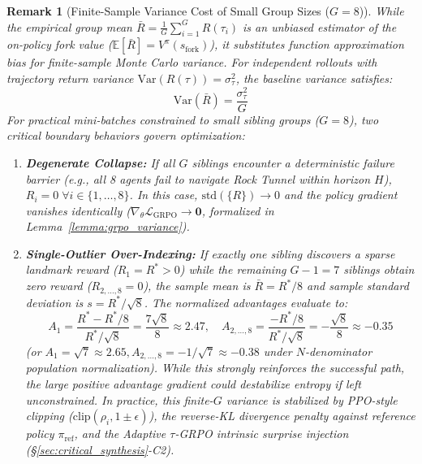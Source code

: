 \documentclass[journal,10pt,twocolumn]{IEEEtran}
\newtheorem{remark}{Remark}
\begin{document}
\begin{remark}[Finite-Sample Variance Cost of Small Group Sizes ($G=8$)]
\label{rem:grpo_variance_cost}
While the empirical group mean $\bar{R} = \frac{1}{G}\sum_{i=1}^G R(\tau_i)$ is an unbiased estimator of the on-policy fork value ($\mathbb{E}[\bar{R}] = V^\pi(s_{\text{fork}})$), it substitutes function approximation bias for finite-sample Monte Carlo variance. For independent rollouts with trajectory return variance $\text{Var}(R(\tau)) = \sigma_\tau^2$, the baseline variance satisfies:
\begin{equation}
\text{Var}(\bar{R}) = \frac{\sigma_\tau^2}{G}
\end{equation}
For practical mini-batches constrained to small sibling groups ($G = 8$), two critical boundary behaviors govern optimization:
\begin{enumerate}
    \item \textbf{Degenerate Collapse:} If all $G$ siblings encounter a deterministic failure barrier (e.g., all 8 agents fail to navigate Rock Tunnel within horizon $H$), $R_i = 0 \; \forall i \in \{1,\dots,8\}$. In this case, $\text{std}(\{R\}) \to 0$ and the policy gradient vanishes identically ($\nabla_\theta \mathcal{L}_{\text{GRPO}} \to \mathbf{0}$, formalized in Lemma~\ref{lemma:grpo_variance}).
    \item \textbf{Single-Outlier Over-Indexing:} If exactly one sibling discovers a sparse landmark reward ($R_1 = R^* > 0$) while the remaining $G-1 = 7$ siblings obtain zero reward ($R_{2,\dots,8} = 0$), the sample mean is $\bar{R} = R^*/8$ and sample standard deviation is $s = R^*/\sqrt{8}$. The normalized advantages evaluate to:
    \begin{equation}
    A_1 = \frac{R^* - R^*/8}{R^*/\sqrt{8}} = \frac{7\sqrt{8}}{8} \approx 2.47, \quad A_{2,\dots,8} = \frac{-R^*/8}{R^*/\sqrt{8}} = -\frac{\sqrt{8}}{8} \approx -0.35
    \end{equation}
    (or $A_1 = \sqrt{7} \approx 2.65, A_{2,\dots,8} = -1/\sqrt{7} \approx -0.38$ under $N$-denominator population normalization). While this strongly reinforces the successful path, the large positive advantage gradient could destabilize entropy if left unconstrained. In practice, this finite-$G$ variance is stabilized by PPO-style clipping ($\text{clip}(\rho_i, 1\pm\epsilon)$), the reverse-KL divergence penalty against reference policy $\pi_{\text{ref}}$, and the Adaptive $\tau$-GRPO intrinsic surprise injection (\S\ref{sec:critical_synthesis}-C2).
\end{enumerate}
\end{remark}
\end{document}
